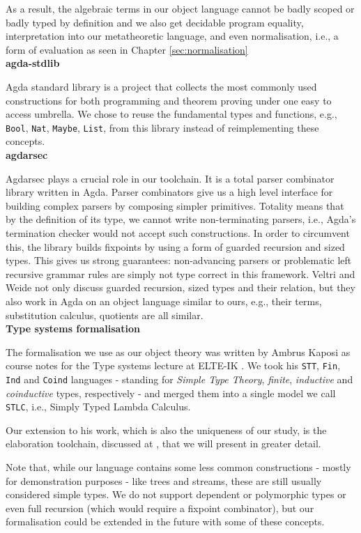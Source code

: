 As a result, the algebraic terms in our object language cannot be badly scoped or badly typed by definition and we also get decidable program equality, interpretation into our metatheoretic language, and even normalisation, i.e., a form of evaluation as seen in Chapter \ref{sec:normalisation}\\

\noindent\textbf{agda-stdlib}

Agda standard library \cite{The_Agda_Community_Agda_Standard_Library_2023} is a project that collects the most commonly used constructions for both programming and theorem proving under one easy to access umbrella. We chose to reuse the fundamental types and functions, e.g., \verb$Bool$, \verb$Nat$, \verb$Maybe$, \verb$List$, from this library instead of reimplementing these concepts.\\

\noindent\textbf{agdarsec}

Agdarsec \cite{allais2018agdarsec} plays a crucial role in our toolchain. It is a total parser combinator library written in Agda. Parser combinators give us a high level interface for building complex parsers by composing simpler primitives. Totality means that by the definition of its type, we cannot write non-terminating parsers, i.e., Agda's termination checker would not accept such constructions. In order to circumvent this, the library builds fixpoints by using a form of guarded recursion and sized types. This gives us strong guarantees: non-advancing parsers or problematic left recursive grammar rules are simply not type correct in this framework. Veltri and Weide \cite{veltri2019guarded} not only discuss guarded recursion, sized types and their relation, but they also work in Agda on an object language similar to ours, e.g., their terms, substitution calculus, quotients are all similar.\\

\noindent\textbf{Type systems formalisation}

The formalisation we use as our object theory was written by Ambrus Kaposi as course notes for the Type systems lecture at ELTE-IK \cite{typesystems-repo}. We took his \verb$STT$, \verb$Fin$, \verb$Ind$ and \verb$Coind$ languages - standing for \textit{Simple Type Theory}, \textit{finite}, \textit{inductive} and \textit{coinductive} types, respectively - and merged them into a single model we call \verb$STLC$, i.e., Simply Typed Lambda Calculus.

Our extension to his work, which is also the uniqueness of our study, is the elaboration toolchain, discussed at \cite{godelTalk}, that we will present in greater detail.

Note that, while our language contains some less common constructions - mostly for demonstration purposes - like trees and streams, these are still usually considered simple types. We do not support dependent or polymorphic types or even full recursion (which would require a fixpoint combinator), but our formalisation could be extended in the future with some of these concepts.

